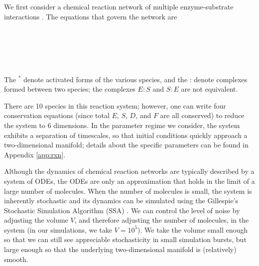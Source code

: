 \documentclass[aip,jcp,reprint,twocolumn]{revtex4-1}
\begin{document}
We first consider a chemical reaction network of multiple enzyme-substrate interactions \cite{zagaris2012stability}.
%
The equations that govern the network are\\
\begin{center}
\\
\\
\\
\\
\end{center}

The $^{*}$ denote activated forms of the various species, and the : denote complexes formed between two species; the complexes $E:S$ and $S:E$ are not equivalent.

There are 10 species in this reaction system;
however, one can write four conservation equations (since total $E$, $S$, $D$, and $F$ are all conserved) to reduce the system to 6 dimensions.
%
%
%
%
In the parameter regime we consider, the system exhibits a separation of timescales, so that initial conditions quickly approach a two-dimensional manifold;
details about the specific parameters can be found in Appendix \ref{app:rxn}.
%

Although the dynamics of chemical reaction networks are typically described by a system of ODEs, the ODEs are only an approximation that holds in the limit of a large number of molecules.
%
When the number of molecules is small, the system is inherently stochastic and its dynamics can be simulated using the Gillespie's Stochastic Simulation Algorithm (SSA) \cite{gillespie1977exact}.
%
We can control the level of noise by adjusting the volume $V$, and therefore adjusting the number of molecules, in the system (in our simulations, we take $V=10^5$).
%
We take the volume small enough so that we can still see appreciable stochasticity in small simulation bursts, but large enough so that the underlying two-dimensional manifold is (relatively) smooth.
\end{document}
